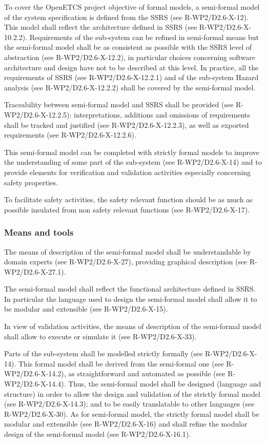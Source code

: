 To cover the OpenETCS project objective  of formal models, a semi-formal model of the system  specification is defined from  the SSRS (see R-WP2/D2.6-X-12). This model shall reflect the architecture defined in SSRS (see R-WP2/D2.6-X-10.2.2). Requirements of the sub-system can be refined in semi-formal means but the semi-formal model  shall be as consistent as possible with the SSRS level of abstraction (see R-WP2/D2.6-X-12.2), in particular choices concerning software architecture and design have not to be described at this level.
In practice, all the requirements of SSRS (see R-WP2/D2.6-X-12.2.1) and of the sub-system Hazard analysis (see R-WP2/D2.6-X-12.2.2) shall be covered by the semi-formal model.

Traceability between semi-formal model and SSRS shall be provided (see R-WP2/D2.6-X-12.2.5): interpretations, additions and omissions of requirements shall be tracked and justified (see R-WP2/D2.6-X-12.2.3), as well as exported requirements  (see R-WP2/D2.6-X-12.2.6).

This semi-formal model can be completed with strictly formal models to improve the understanding of some part of the sub-system (see R-WP2/D2.6-X-14) and to  provide elements for verification and validation activities especially concerning safety properties.

To facilitate safety activities, the safety relevant function should be as much as possible insulated from non safety relevant functions (see R-WP2/D2.6-X-17).


\subsubsection{Means and tools}

The means of description of the semi-formal model shall be understandable by domain experts (see R-WP2/D2.6-X-27), providing graphical  description (see R-WP2/D2.6-X-27.1).

The semi-formal model shall reflect the functional architecture defined in SSRS. In particular the language used to  design the semi-formal model shall allow it to be modular and extensible (see R-WP2/D2.6-X-15).

In view of validation activities, the means of description of the semi-formal model shall allow to execute or simulate it (see R-WP2/D2.6-X-33).

Parts of the sub-system shall be modelled strictly formally (see R-WP2/D2.6-X-14). This formal model shall be derived from the semi-formal one (see R-WP2/D2.6-X-14.2), as straightforward and automated as possible (see R-WP2/D2.6-X-14.4). Thus, the semi-formal model shall be designed (language and structure) in order to allow the design and validation of the strictly formal model (see R-WP2/D2.6-X-14.3); and to be easily translatable to other languages (see R-WP2/D2.6-X-30).
As for semi-formal model, the strictly formal model shall be modular and extensible (see R-WP2/D2.6-X-16) and shall refine the modular design of the semi-formal model (see R-WP2/D2.6-X-16.1).


